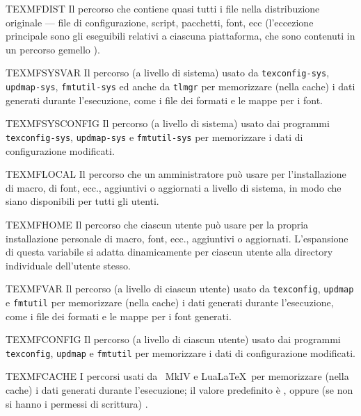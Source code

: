 \documentclass{article}
\begin{document}
\begin{ttdescription}
\item [TEXMFDIST] Il percorso che contiene quasi tutti i file nella
  distribuzione originale --- file di configurazione, script, pacchetti,
  font, ecc (l'eccezione principale sono gli eseguibili relativi a ciascuna
  piattaforma, che sono contenuti in un percorso gemello ).
\item [TEXMFSYSVAR] Il percorso (a livello di sistema) usato da
  \verb+texconfig-sys+, \verb+updmap-sys+, \verb+fmtutil-sys+ ed anche da
  \verb+tlmgr+ per memorizzare (nella cache) i dati generati durante 
  l'esecuzione, come i file dei formati e le mappe per i font.
\item [TEXMFSYSCONFIG] Il percorso (a livello di sistema) usato dai
  programmi \verb+texconfig-sys+, \verb+updmap-sys+ e \verb+fmtutil-sys+
  per memorizzare i dati di configurazione modificati.
\item [TEXMFLOCAL] Il percorso che un amministratore può usare per
  l'installazione di macro, di font, ecc., aggiuntivi o aggiornati a livello
  di sistema, in modo che siano disponibili per tutti gli utenti.
\item [TEXMFHOME] Il percorso che ciascun utente può usare per la propria
  installazione personale di macro, font, ecc., aggiuntivi o aggiornati.
  L'espansione di questa variabile si adatta dinamicamente per ciascun
  utente alla directory individuale dell'utente stesso.
\item [TEXMFVAR] Il percorso (a livello di ciascun utente) usato da
  \verb+texconfig+, \verb+updmap+ e \verb+fmtutil+ per memorizzare (nella 
  cache) i dati generati durante l'esecuzione, come i file dei formati e le
  mappe per i font generati.
\item [TEXMFCONFIG] Il percorso (a livello di ciascun utente) usato dai
  programmi \verb+texconfig+, \verb+updmap+ e \verb+fmtutil+ per
  memorizzare i dati di configurazione modificati.
\item [TEXMFCACHE] I percorsi usati da \ConTeXt\ MkIV e Lua\LaTeX\
  per memorizzare (nella cache) i dati generati durante l'esecuzione; il valore 
  predefinito è \code{TEXMFSYSVAR}, oppure (se non si hanno i permessi di
  scrittura) \code{TEXMFVAR}.
\end{ttdescription}
\end{document}
